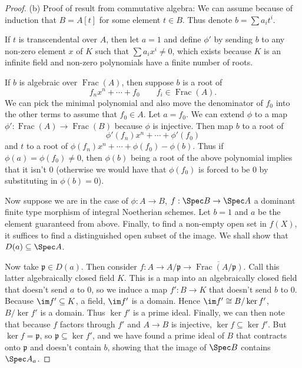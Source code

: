 \begin{proof}
	(b) 
	Proof of result from commutative algebra:
	We can assume because of induction that $B = A[t]$ for some element $t\in B $.
	Thus denote $b = \sum a_it^i $.

	If $t $ is transcendental over $A $, then let $a =1$ and define $\phi ' $ by sending $b $ to any non-zero element $x $ of $K $ such that $\sum a_ix^i \ne 0 $, which exists because $K $ is an infinite field and non-zero polynomials have a finite number of roots.

	If $b $ is algebraic over $\operatorname{Frac}(A) $, then suppose $b $ is a root of
	\[
		f_nx^{n} + \cdots + f_{0} \qquad f_i \in \operatorname{Frac}(A).
	\]
	We can pick the minimal polynomial and also move the denominator of $f_0 $ into the other terms to assume that $f_0 \in A $.
	Let $a = f_0 $.
	We can extend $\phi  $ to a map $\phi ': \operatorname{Frac}(A) \to \operatorname{Frac}(B) $ because $\phi  $ is injective.
	Then map $b $ to a root of
	\[
		\phi'(f_n) x^n + \cdots + \phi'(f_{0})
	\] 
	and $t $ to a root of $\phi (f_n) x^n + \cdots + \phi (f_{0}) - \phi (b)$.
	Thus if $\phi (a) = \phi (f_{0}) \ne 0 $, then $\phi (b) $ being a root of the above polynomial implies that it isn't $0 $ (otherwise we would have that $\phi (f_{0})$ is forced to be $0 $ by substituting in $\phi (b)=0 $).

	Now suppose we are in the case of $\phi : A\to B $, $f:\Spec B \to \Spec A$ a dominant finite type morphism of integral Noetherian schemes.
	Let $b =1 $ and $a$ be the element guaranteed from above.
	Finally, to find a non-empty open set in $f(X) $, it suffices to find a distinguished open subset of the image.
	We shall show that $D(a) \subseteq \Spec A $.

	Now take $\mathfrak{p} \in D(a) $.
	Then consider $f :A \to A / \mathfrak{p}\to \overline{\operatorname{Frac}(A /\mathfrak{p})}$.
	Call this latter algebraically closed field $K $.
	This is a map into an algebraically closed field that doesn't send $a $ to $0 $, so we induce a map $f': B \to K$ that doesn't send $b $ to $0 $.
	Because $\im f' \subseteq K$, a field, $\im f ' $ is a domain.
	Hence $\im f ' \cong B / \ker f ' $, $B / \ker f ' $ is a domain.
	Thus $\ker f ' $ is a prime ideal.
	Finally, we can then note that because $f$ factors through $f ' $ and $A\to B $ is injective, $\ker f \subseteq \ker f' $.
	But $\ker f = \mathfrak{p} $, so $\mathfrak{p} \subseteq \ker f' $, and we have found a prime ideal of $B $ that contracts onto $\mathfrak{p} $ and doesn't contain $b $, showing that the image of $\Spec B$ contains $\Spec A_a $.


\end{proof}
